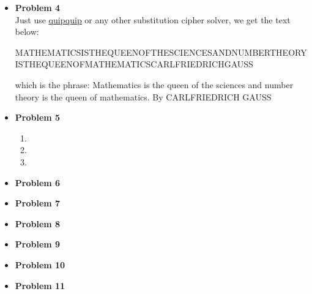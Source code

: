 \documentclass{article}
\begin{document}
\begin{itemize}
\begin{enumerate}[label=(\roman*)]
		\end{enumerate}
	\item{\textcolor{for}{\textbf{Problem 4}}}\\
		Just use \href{https://quipqiup.com/}{\underline{quipquip}} or any other substitution cipher solver, we get the text below:\\
		\begin{small}
			MATHEMATICSISTHEQUEENOFTHESCIENCESANDNUMBERTHEORYISTHEQUEENOFMATHEMATICSCARLFRIEDRICHGAUSS 
		\end{small}
		which is the phrase:
			Mathematics is the queen of the sciences and number theory is the queen of mathematics. By CARLFRIEDRICH GAUSS
	\item{\textcolor{for}{\textbf{Problem 5}}}
		\begin{enumerate}[label=(\alph*)]
			\item
			\item
			\item
		\end{enumerate}
	\item{\textcolor{for}{\textbf{Problem 6}}}
	\item{\textcolor{for}{\textbf{Problem 7}}}
	\item{\textcolor{for}{\textbf{Problem 8}}}
	\item{\textcolor{for}{\textbf{Problem 9}}}
	\item{\textcolor{for}{\textbf{Problem 10}}}
	\item{\textcolor{for}{\textbf{Problem 11}}}
\end{itemize}
\end{document}
